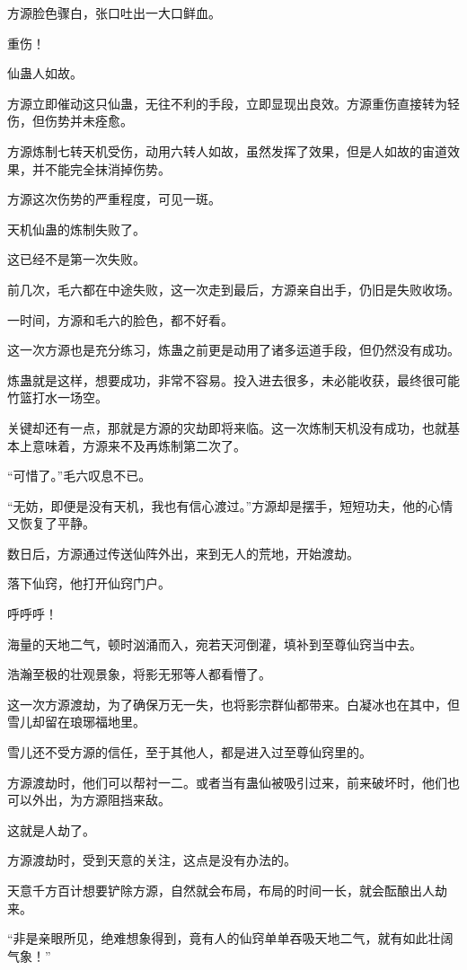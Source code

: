 \begin{this_body}
方源脸色骤白，张口吐出一大口鲜血。

重伤！

仙蛊人如故。

方源立即催动这只仙蛊，无往不利的手段，立即显现出良效。方源重伤直接转为轻伤，但伤势并未痊愈。

方源炼制七转天机受伤，动用六转人如故，虽然发挥了效果，但是人如故的宙道效果，并不能完全抹消掉伤势。

方源这次伤势的严重程度，可见一斑。

天机仙蛊的炼制失败了。

这已经不是第一次失败。

前几次，毛六都在中途失败，这一次走到最后，方源亲自出手，仍旧是失败收场。

一时间，方源和毛六的脸色，都不好看。

这一次方源也是充分练习，炼蛊之前更是动用了诸多运道手段，但仍然没有成功。

炼蛊就是这样，想要成功，非常不容易。投入进去很多，未必能收获，最终很可能竹篮打水一场空。

关键却还有一点，那就是方源的灾劫即将来临。这一次炼制天机没有成功，也就基本上意味着，方源来不及再炼制第二次了。

“可惜了。”毛六叹息不已。

“无妨，即便是没有天机，我也有信心渡过。”方源却是摆手，短短功夫，他的心情又恢复了平静。

数日后，方源通过传送仙阵外出，来到无人的荒地，开始渡劫。

落下仙窍，他打开仙窍门户。

呼呼呼！

海量的天地二气，顿时汹涌而入，宛若天河倒灌，填补到至尊仙窍当中去。

浩瀚至极的壮观景象，将影无邪等人都看懵了。

这一次方源渡劫，为了确保万无一失，也将影宗群仙都带来。白凝冰也在其中，但雪儿却留在琅琊福地里。

雪儿还不受方源的信任，至于其他人，都是进入过至尊仙窍里的。

方源渡劫时，他们可以帮衬一二。或者当有蛊仙被吸引过来，前来破坏时，他们也可以外出，为方源阻挡来敌。

这就是人劫了。

方源渡劫时，受到天意的关注，这点是没有办法的。

天意千方百计想要铲除方源，自然就会布局，布局的时间一长，就会酝酿出人劫来。

“非是亲眼所见，绝难想象得到，竟有人的仙窍单单吞吸天地二气，就有如此壮阔气象！”


\end{this_body}
